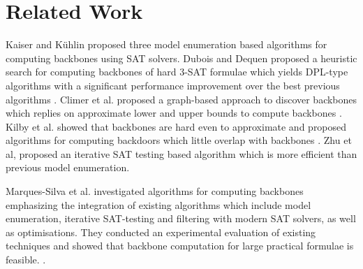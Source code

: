 \section{Related Work}\label{sec:relw}

Kaiser and K\"{u}hlin proposed three model enumeration based algorithms for computing backbones \cite{KKW2001} using SAT solvers. 
%
Dubois and Dequen proposed a heuristic search for computing backbones of hard 3-SAT formulae which yields DPL-type algorithms with a significant
performance improvement over the best previous algorithms \cite{DD2001}.
Climer et al. proposed a graph-based approach to discover backbones which replies on approximate lower and upper bounds to compute
backbones \cite{CZ2002}.%
Kilby et al. showed that backbones are hard even to approximate and proposed algorithms for computing backdoors which little overlap with backbones \cite{KPS2005}.
%
%
Zhu et al, proposed an iterative SAT testing based algorithm \cite{ZWSM11,ZWM11} which is more efficient than previous model enumeration. 

Marques-Silva et al.  investigated algorithms for computing backbones emphasizing the integration of existing algorithms which include model enumeration, iterative SAT-testing and filtering with modern SAT solvers, as well as optimisations. 
They conducted an experimental evaluation of existing techniques and showed that backbone computation for large practical formulae is feasible. \cite{MJML2010,JLMS12,JLM15}. 


